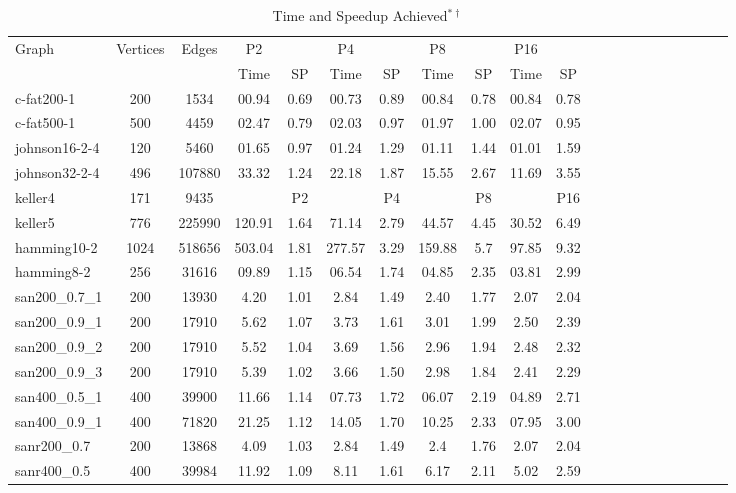 \documentclass[11pt]{article}
\begin{document}
\linespread{1}
\begin{table*}[ht!]
\caption{Time and Speedup Achieved$^{*\dag}$\label{tab:spar_su_par_table}}
\begin{footnotesize}
\begin{center}
\begin{tabular}{|l|c|c|cc|cc|cc|cc|cc|cc|cc|cc|cc|}
\hline
Graph 	&Vertices &Edges             &P2   &   &P4  &   &P8   &   &P16  &\\
        &         &                  &Time &SP &Time &SP &Time &SP &Time &SP\\
\hline											            				       
c-fat200-1 	&200 	&1534 		     &00.94 &0.69 &00.73 &0.89 &00.84 &0.78 &00.84 &0.78\\
c-fat500-1 	&500 	&4459 		     &02.47 &0.79 &02.03 &0.97 &01.97 &1.00 &02.07 &0.95\\
\hline
johnson16-2-4 	&120 	&5460 		 &01.65 &0.97 &01.24 &1.29 &01.11 &1.44 &01.01 &1.59\\
johnson32-2-4 	&496 	&107880 	 &33.32 &1.24 &22.18 &1.87 &15.55 &2.67 &11.69 &3.55\\
\hline 
keller4 	&171 	&9435 			 & &P2   & &P4   & &P8   & &P16  \\
keller5 	&776 	&225990 		 &120.91 &1.64 &71.14 &2.79 &44.57 &4.45 &30.52 &6.49\\
\hline
hamming10-2 	&1024 	&518656 	 &503.04 &1.81 &277.57 &3.29 &159.88 &5.7 &97.85 &9.32\\
hamming8-2 	    &256 	&31616 	     &09.89  &1.15 &06.54  &1.74 &04.85 &2.35 &03.81 &2.99\\
\hline
san200\_0.7\_1 	&200    &13930 	     &4.20 &1.01 &2.84 &1.49 &2.40 &1.77 &2.07 &2.04\\
san200\_0.9\_1 	&200 	&17910 	     &5.62 &1.07 &3.73 &1.61 &3.01 &1.99 &2.50 &2.39\\
san200\_0.9\_2 	&200 	&17910 	     &5.52 &1.04 &3.69 &1.56 &2.96 &1.94 &2.48 &2.32\\
san200\_0.9\_3 	&200 	&17910 	     &5.39 &1.02 &3.66 &1.50 &2.98 &1.84 &2.41 &2.29\\
san400\_0.5\_1 	&400 	&39900 	     &11.66 &1.14 &07.73 &1.72 &06.07 &2.19 &04.89 &2.71\\
san400\_0.9\_1 	&400 	&71820 	     &21.25 &1.12 &14.05 &1.70 &10.25 &2.33 &07.95 &3.00\\
\hline
sanr200\_0.7 	&200 	&13868 	     &4.09 &1.03 &2.84 &1.49 &2.4 &1.76 &2.07 &2.04\\
sanr400\_0.5 	&400 	&39984 	     &11.92 &1.09 &8.11 &1.61 &6.17 &2.11 &5.02 &2.59\\

\end{tabular}
\end{center}
\end{footnotesize}
\end{table*}
\end{document}
